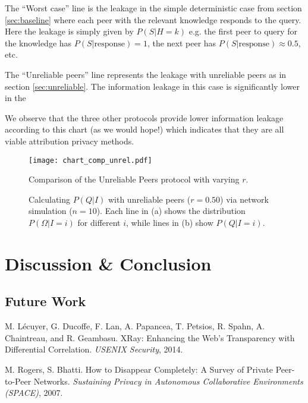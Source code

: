 \documentclass{article}
\newcommand{\secref}[1]{section \ref{sec:#1}}
\begin{document}
The ``Worst case'' line is the leakage in the simple deterministic case from
\secref{baseline} where each peer with the relevant knowledge responds to the
query. Here the leakage is simply given by $P(S|H=k)$ e.g. the first peer to
query for the knowledge has $P(S|\text{response})=1$, the next peer has
$P(S|\text{response})\approx 0.5$, etc.

The ``Unreliable peers'' line represents the leakage with unreliable peers as in
\secref{unreliable}. The information leakage in this case is significantly lower
in the 

We observe that the three other
protocols provide lower information leakage according to this chart (as we would
hope!) which indicates that they are all viable attribution privacy methods.


\begin{figure}%
    \centering
	\texttt{[image: chart\_comp\_unrel.pdf]}
	\caption{Comparison of the Unreliable Peers protocol with varying $r$.}
    \label{fig:comp_unrel}%
\end{figure}

\begin{figure}%
    \centering
	\caption{Calculating $P(Q|I)$ with unreliable peers ($r=0.50$) via network
	simulation ($n=10$). Each line in (a) shows the distribution
	$P(\Omega|I=i)$ for different $i$, while lines in (b) show $P(Q|I=i)$.}
    \label{fig:unreliable}%
\end{figure}

\section{Discussion \& Conclusion}

\subsection{Future Work}

\begin{thebibliography}{9}

	M. L\'ecuyer, G. Ducoffe, F. Lan, A. Papancea, T. Petsios, R. Spahn, A. Chaintreau, and R. Geambasu.
	XRay: Enhancing the Web's Transparency with Differential Correlation.
	\emph{USENIX Security}, 2014.

	M. Rogers, S. Bhatti.
	How to Disappear Completely: A Survey of Private Peer-to-Peer Networks.
	\emph{Sustaining Privacy in Autonomous Collaborative Environments (SPACE)}, 2007.

\end{thebibliography}
\end{document}
